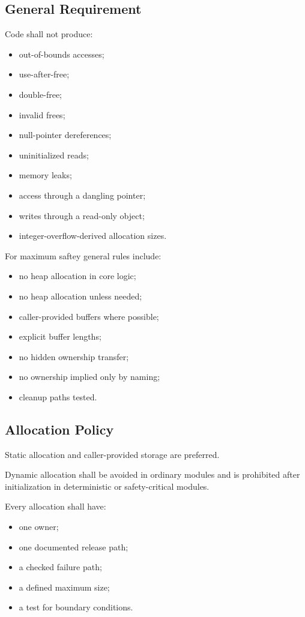 \subsection{General Requirement}

Code shall not produce:

\begin{itemize}
	\item out-of-bounds accesses;
	\item use-after-free;
	\item double-free;
	\item invalid frees;
	\item null-pointer dereferences;
	\item uninitialized reads;
	\item memory leaks;
	\item access through a dangling pointer;
	\item writes through a read-only object;
	\item integer-overflow-derived allocation sizes.
\end{itemize}

For maximum saftey general rules include:

\begin{itemize}
    \item no heap allocation in core logic;
    \item no heap allocation unless needed;
    \item caller-provided buffers where possible;
    \item explicit buffer lengths;
    \item no hidden ownership transfer;
    \item no ownership implied only by naming;
    \item cleanup paths tested.
\end{itemize}

\subsection{Allocation Policy}

Static allocation and caller-provided storage are preferred.

Dynamic allocation shall be avoided in ordinary modules and is prohibited after initialization in deterministic or safety-critical modules.

Every allocation shall have:

\begin{itemize}
	\item one owner;
	\item one documented release path;
	\item a checked failure path;
	\item a defined maximum size;
	\item a test for boundary conditions.
\end{itemize}

